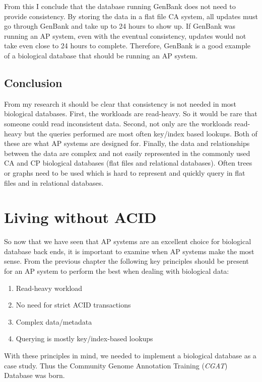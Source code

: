 \documentclass[12pt]{ucthesis}
\begin{document}
From this I conclude that the database running GenBank does not need to provide consistency. By storing the data in a flat file CA system, all updates must go through GenBank and take up to 24 hours to show up. If GenBank was running an AP system, even with the eventual consistency, updates would not take even close to 24 hours to complete. Therefore, GenBank is a good example of a biological database that should be running an AP system.


\section{Conclusion}
From my research it should be clear that consistency is not needed in most biological databases. First, the workloads are read-heavy. So it would be rare that someone could read inconsistent data. Second, not only are the workloads read-heavy but the queries performed are most often key/index based lookups. Both of these are what AP systems are designed for. Finally, the data and relationships between the data are complex and not
easily represented in the commonly used CA and CP biological databases (flat files and relational databases).
Often trees or graphs need to be used which is hard to represent and quickly query in flat files
and in relational databases.



\chapter{Living without ACID}
\label{case-study}

So now that we have seen that AP systems are an excellent choice for biological database back ends,
it is important to examine when AP systems make the most sense. From the previous chapter the following
key principles should be present for an AP system to perform the best when dealing with biological data:

\begin{enumerate}
\item Read-heavy workload
\item No need for strict ACID transactions
\item Complex data/metadata
\item Querying is mostly key/index-based lookups
\end{enumerate}

With these principles in mind, we needed to implement a biological database as a case study.
Thus the Community Genome Annotation Training (\textit{CGAT}) Database was born.
\end{document}
